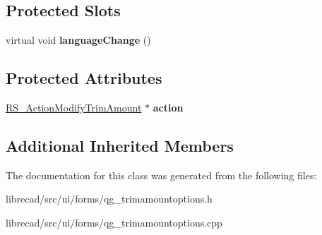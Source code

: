 \subsection*{Protected Slots}
\begin{DoxyCompactItemize}
\item 
\hypertarget{classQG__TrimAmountOptions_a2793e7380f14f59cbf595a3d2efafd64}{virtual void {\bfseries language\-Change} ()}\label{classQG__TrimAmountOptions_a2793e7380f14f59cbf595a3d2efafd64}

\end{DoxyCompactItemize}
\subsection*{Protected Attributes}
\begin{DoxyCompactItemize}
\item 
\hypertarget{classQG__TrimAmountOptions_a1295bc98880f942db8e46a3ce90c13df}{\hyperlink{classRS__ActionModifyTrimAmount}{R\-S\-\_\-\-Action\-Modify\-Trim\-Amount} $\ast$ {\bfseries action}}\label{classQG__TrimAmountOptions_a1295bc98880f942db8e46a3ce90c13df}

\end{DoxyCompactItemize}
\subsection*{Additional Inherited Members}


The documentation for this class was generated from the following files\-:\begin{DoxyCompactItemize}
\item 
librecad/src/ui/forms/qg\-\_\-trimamountoptions.\-h\item 
librecad/src/ui/forms/qg\-\_\-trimamountoptions.\-cpp\end{DoxyCompactItemize}
